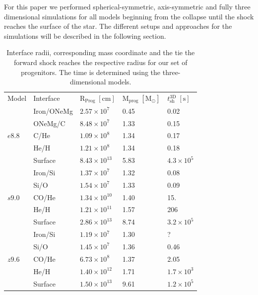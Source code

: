 \documentclass[fleqn,usenatbib]{mnras}
\begin{document}
For this paper we performed spherical-symmetric, axis-symmetric and fully three dimensional simulations for all models beginning from the collapse until the shock reaches the surface of the star. The different setups and approaches for the simulations will be described in the following section.


\begin{table}
   \begin{tabular}{l l l l l} 
   \hline
     Model      &Interface & $\mathrm{R_{Prog}\;[cm]}$ & $\mathrm{M_{prog}\;[M_{\odot}]}$ & $t_{\mathrm{sh}}^{\mathrm{3D}}\;\mathrm{[s]}$\\ [0.5ex] 
   \multirow{5}{*}{$e8.8$} & Iron/ONeMg & $2.57\times 10^{7}$  & 0.45 & 0.02 \\ 
                           & ONeMg/C    & $8.48\times 10^{7}$  & 1.33 & 0.15 \\
                           & C/He       & $1.09\times 10^{8}$  & 1.34 & 0.17 \\
                           & He/H       & $1.21\times 10^{8}$  & 1.34 & 0.18\\
                           & Surface    & $8.43\times 10^{13}$ & 5.83 & $4.3\times10^5$\\
   \hline
   \multirow{5}{*}{$s9.0$} & Iron/Si    & $1.37\times 10^{7}$   & 1.32 & 0.08 \\ 
                           & Si/O       & $1.54\times 10^{7}$   & 1.33 & 0.09 \\ 
                           & CO/He      & $1.34\times 10^{10}$  & 1.40 & 15. \\
                           & He/H       & $1.21\times 10^{11}$  & 1.57 & 206 \\
                           & Surface    & $2.86\times 10^{13}$  & 8.74 & $3.2\times 10^5$ \\
   \hline
   \multirow{5}{*}{$z9.6$} & Iron/Si    & $1.19\times 10^{7}$  & 1.30 & ?\\ 
                           & Si/O       & $1.45\times 10^{7}$  & 1.36 & 0.46\\ 
                           & CO/He      & $6.73\times 10^{8}$  & 1.37 & 2.05\\
                           & He/H       & $1.40\times 10^{12}$ & 1.71 & $1.7\times10^{3}$\\
                           & Surface    & $1.50\times 10^{13}$ & 9.61 & $1.2\times10^5$  \\
   \end{tabular}
   \caption{Interface radii, corresponding mass coordinate and the tie the forward shock reaches the respective radius for our set of progenitors. The time is determined using the three-dimensional models.}
   \label{tab:progenitors}
\end{table}
\end{document}
